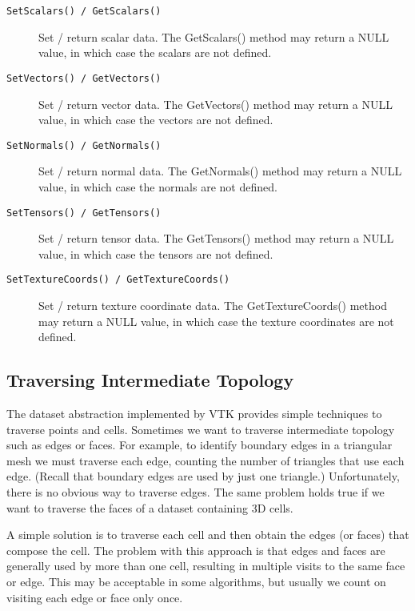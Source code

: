 \begin{description}
\begin{description}
    \item[\texttt{SetScalars() / GetScalars()}]
    Set / return scalar data. The GetScalars() method may return a NULL value, in which case the scalars are not defined.

    \item[\texttt{SetVectors() / GetVectors()}]
    Set / return vector data. The GetVectors() method may return a NULL value, in which case the vectors are not defined.

    \item[\texttt{SetNormals() / GetNormals()}]
    Set / return normal data. The GetNormals() method may return a NULL value, in which case the normals are not defined.

    \item[\texttt{SetTensors() / GetTensors()}]
    Set / return tensor data. The GetTensors() method may return a NULL value, in which case the tensors are not defined.

    \item[\texttt{SetTextureCoords() / GetTextureCoords()}]
    Set / return texture coordinate data. The GetTextureCoords() method may return a NULL value, in which case the texture coordinates are not defined.

    \end{description}
\end{description}

\subsection{Traversing Intermediate Topology}

The dataset abstraction implemented by VTK provides simple techniques to traverse points and cells. Sometimes we want to traverse intermediate topology such as edges or faces. For example, to identify boundary edges in a triangular mesh we must traverse each edge, counting the number of triangles that use each edge. (Recall that boundary edges are used by just one triangle.) Unfortunately, there is no obvious way to traverse edges. The same problem holds true if we want to traverse the faces of a dataset containing 3D cells.

A simple solution is to traverse each cell and then obtain the edges (or faces) that compose the cell. The problem with this approach is that edges and faces are generally used by more than one cell, resulting in multiple visits to the same face or edge. This may be acceptable in some algorithms, but usually we count on visiting each edge or face only once.

